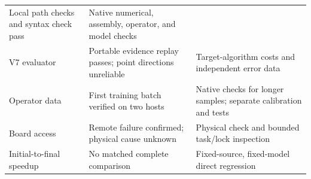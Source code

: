 \documentclass[10pt,a4paper]{article}
\begin{document}
\begin{longtable}[]{@{}lll@{}}
\begin{minipage}[t]{0.30\columnwidth}
Local path checks and syntax check pass\strut
\end{minipage} & \begin{minipage}[t]{0.30\columnwidth}\raggedright
Native numerical, assembly, operator, and model checks\strut
\end{minipage}\tabularnewline
\begin{minipage}[t]{0.30\columnwidth}\raggedright
V7 evaluator\strut
\end{minipage} & \begin{minipage}[t]{0.30\columnwidth}\raggedright
Portable evidence replay passes; point directions unreliable\strut
\end{minipage} & \begin{minipage}[t]{0.30\columnwidth}\raggedright
Target-algorithm costs and independent error data\strut
\end{minipage}\tabularnewline
\begin{minipage}[t]{0.30\columnwidth}\raggedright
Operator data\strut
\end{minipage} & \begin{minipage}[t]{0.30\columnwidth}\raggedright
First training batch verified on two hosts\strut
\end{minipage} & \begin{minipage}[t]{0.30\columnwidth}\raggedright
Native checks for longer samples; separate calibration and tests\strut
\end{minipage}\tabularnewline
\begin{minipage}[t]{0.30\columnwidth}\raggedright
Board access\strut
\end{minipage} & \begin{minipage}[t]{0.30\columnwidth}\raggedright
Remote failure confirmed; physical cause unknown\strut
\end{minipage} & \begin{minipage}[t]{0.30\columnwidth}\raggedright
Physical check and bounded task/lock inspection\strut
\end{minipage}\tabularnewline
\begin{minipage}[t]{0.30\columnwidth}\raggedright
Initial-to-final speedup\strut
\end{minipage} & \begin{minipage}[t]{0.30\columnwidth}\raggedright
No matched complete comparison\strut
\end{minipage} & \begin{minipage}[t]{0.30\columnwidth}\raggedright
Fixed-source, fixed-model direct regression\strut
\end{minipage}\tabularnewline
\bottomrule
\end{longtable}
\end{document}
